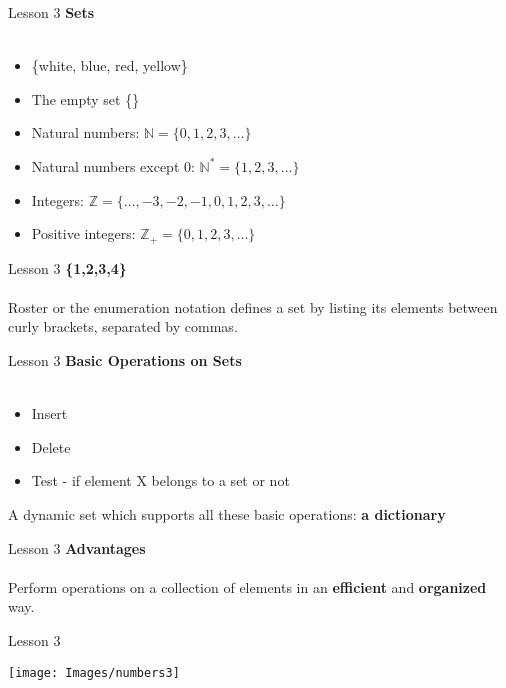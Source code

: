 \documentclass[aspectratio=1610]{beamer}
\begin{document}
\begin{frame}{Lesson 3}{}
\LARGE
\textbf{Sets}\\~\\
\begin{itemize}
	\item \{white, blue, red, yellow\}
    \item The empty set \{\}
    \item Natural numbers: $\mathbb{N} = \{0, 1, 2, 3, \ldots\}$
    \item Natural numbers except 0: $\mathbb{N^*} = \{1, 2, 3, \ldots\}$
    \item Integers: $\mathbb{Z} = \{\ldots, -3, -2, -1, 0, 1, 2, 3, \ldots\}$
    \item Positive integers: $\mathbb{Z_+} = \{0, 1, 2, 3, \ldots\}$
\end{itemize}
\end{frame}



\begin{frame}{Lesson 3}{}
\Huge{\textbf{\{1,2,3,4\}}}\\~\\
\LARGE
Roster or the enumeration notation defines a set by listing its elements between curly brackets, separated by commas.
\end{frame}


\begin{frame}{Lesson 3}{}
\LARGE
\textbf{Basic Operations on Sets}\\~\\
\begin{itemize}
    \item Insert
    \item Delete
    \item Test - if element X belongs to a set or not 
\end{itemize}

A dynamic set which supports all these basic operations: \textbf{a dictionary} 
\end{frame}


\begin{frame}{Lesson 3}{}
\LARGE
\textbf{Advantages}\\~\\
Perform operations on a collection of elements in an \textbf{efficient} and \textbf{organized} way.
\end{frame}


\begin{frame}{Lesson 3}{}
\begin{center}
\texttt{[image: Images/numbers3]}
\end{center}
\end{frame}
\end{document}
